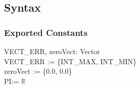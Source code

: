\documentclass[12pt]{article}
\begin{document}
\subsection{Syntax}

\subsubsection{Exported Constants} \label{SecECVector}
	VECT_ERR, zeroVect: Vector \\
	VECT_ERR := \{INT_MAX, INT_MIN\} \\
	zeroVect := \{0.0, 0.0\}\\
	PI:= $\mathbb{R}$\\
	

\end{document}
